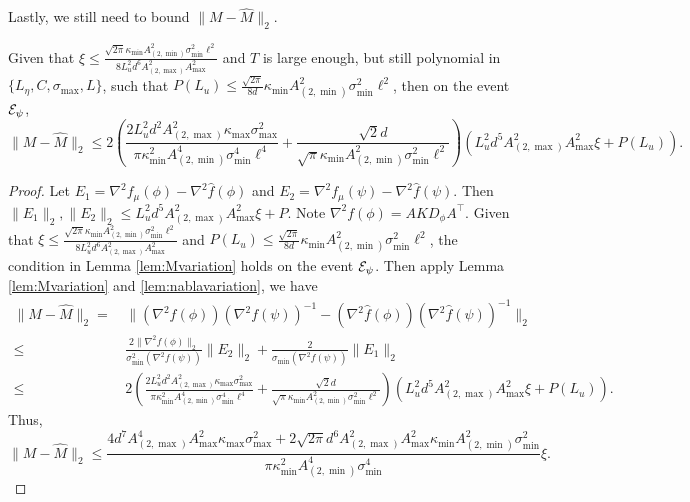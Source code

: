 Lastly, we still need to bound $\|M - \hat{M}\|_2$.
\begin{lemma}
\label{lem:Mvariation_alg}
Given that  $\xi \le  \frac{\sqrt{2\pi}\kappa_{\min}A^2_{(2,\min)}\sigma_{\min}^2\ell^2}{8L_u^2d^6 A_{(2,\max)}^2A_{\max}^2}$ and $T$  is large enough, but still polynomial in $\{L_\eta, C, \sigma_{\max}, L\}$, such that $P(L_u) \le \frac{\sqrt{2\pi}}{8d}\kappa_{\min}A^2_{(2,\min)}\sigma_{\min}^2\ell^2$, then on the event $\mathcal{E}_{\psi}$, 
\[ 
\|M - \hat{M}\|_2 \le 2\left( \frac{2L_u^2d^2A_{(2,\max)}^2\kappa_{\max}\sigma_{\max}^2}{\pi\kappa^2_{\min}A^4_{(2,\min)}\sigma_{\min}^4\ell^4} + 
\frac{\sqrt{2}d}{\sqrt{\pi}\kappa_{\min}A^2_{(2,\min)}\sigma_{\min}^2\ell^2}
\right)\left(L_u^2d^5 A_{(2,\max)}^2A_{\max}^2\xi + P(L_u)\right).
\]
\end{lemma}
\begin{proof}
Let $E_1 = \nabla^2 f_{\mu}(\phi) - \nabla^2 \hat{f}(\phi)$ and $ E_2 = \nabla^2 f_{\mu}(\psi) - \nabla^2 \hat{f}(\psi)$. Then $\|E_1\|_2 , \|E_2\|_2 \le L_u^2d^5 A_{(2,\max)}^2A_{\max}^2\xi + P$.
Note $\nabla^2f(\phi) = AKD_{\phi} A^{\top}$.
Given that 
$\xi \le  \frac{\sqrt{2\pi}\kappa_{\min}A^2_{(2,\min)}\sigma_{\min}^2\ell^2}{8L_u^2d^6 A_{(2,\max)}^2A_{\max}^2}$ 
and $P(L_u) \le \frac{\sqrt{2\pi}}{8d}\kappa_{\min}A^2_{(2,\min)}\sigma_{\min}^2\ell^2$, the condition in Lemma \ref{lem:Mvariation} holds on the event $\mathcal{E}_{\psi}$. 
Then apply Lemma \ref{lem:Mvariation} and \ref{lem:nablavariation}, we have
\begin{align*}
\|M - \hat{M}\|_2 =\, & \|(\nabla^2 f(\phi))(\nabla^2f(\psi))^{-1} - (\nabla^2 \hat{f}(\phi))(\nabla^2\hat{f}(\psi))^{-1} \|_2 \\
\le \, &\frac{2\|\nabla^2 f(\phi)\|_2}{\sigma_{\min}^2(\nabla^2f(\psi))}\|E_2\|_2 + \frac{2}{\sigma_{\min}(\nabla^2f(\psi))}\|E_1\|_2 \\
\le \, & 2\left( \frac{2L_u^2d^2A_{(2,\max)}^2\kappa_{\max}\sigma_{\max}^2}{\pi\kappa^2_{\min}A^4_{(2,\min)}\sigma_{\min}^4\ell^4} + 
\frac{\sqrt{2}d}{\sqrt{\pi}\kappa_{\min}A^2_{(2,\min)}\sigma_{\min}^2\ell^2}
\right)\left(L_u^2d^5 A_{(2,\max)}^2A_{\max}^2\xi + P(L_u)\right).
\end{align*}
Thus, 
\[ 
\|M - \hat{M}\|_2 \le \frac{4d^7A_{(2,\max)}^4A_{\max}^2\kappa_{\max}\sigma_{\max}^2 + 2\sqrt{2\pi}d^6A_{(2,\max)}^2A_{\max}^2\kappa_{\min}A^2_{(2,\min)}\sigma_{\min}^2}{\pi\kappa^2_{\min}A^4_{(2,\min)}\sigma_{\min}^4} \xi.
\]
\fi
\end{proof}
